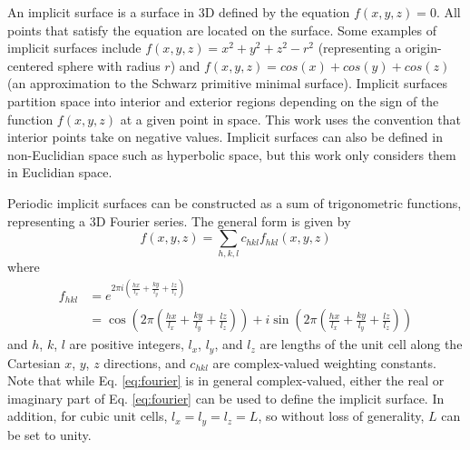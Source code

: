 \documentclass{article}
\begin{document}
An implicit surface is a surface in 3D defined by the equation $f(x, y, z) = 0$. All points that satisfy the equation are located on the surface. Some examples of implicit surfaces include $f(x, y, z) = x^2 + y^2 + z^2 - r^2$ (representing a origin-centered sphere with radius $r$) and $f(x, y, z) = cos(x) + cos(y) + cos(z)$ (an approximation to the Schwarz primitive minimal surface). Implicit surfaces partition space into interior and exterior regions depending on the sign of the function $f(x, y, z)$ at a given point in space. This work uses the convention that interior points take on negative values. Implicit surfaces can also be defined in non-Euclidian space such as hyperbolic space, but this work only considers them in Euclidian space.

Periodic implicit surfaces can be constructed as a sum of trigonometric functions, representing a 3D Fourier series. The general form is given by
\begin{equation}
    \label{eq:fourier}
        f(x, y, z) = \sum\limits_{h,k,l} c_{hkl} f_{hkl}(x, y, z)
\end{equation}
where
\begin{equation}
    \begin{split}
        f_{hkl} & = e^{2\pi i\left(\frac{hx}{l_x}+\frac{ky}{l_y}+\frac{lz}{l_z}\right)} \\
        & = \cos{\left(2\pi \left(\frac{hx}{l_x}+\frac{ky}{l_y}+\frac{lz}{l_z}\right)\right)} + i \sin{\left(2\pi \left(\frac{hx}{l_x}+\frac{ky}{l_y}+\frac{lz}{l_z}\right)\right)}
    \end{split}
\end{equation}
and $h$, $k$, $l$ are positive integers, $l_x$, $l_y$, and $l_z$ are lengths of the unit cell along the Cartesian $x$, $y$, $z$ directions, and $c_{hkl}$ are complex-valued weighting constants. Note that while Eq. \ref{eq:fourier} is in general complex-valued, either the real or imaginary part of Eq. \ref{eq:fourier} can be used to define the implicit surface. In addition, for cubic unit cells, $l_x = l_y = l_z = L$, so without loss of generality, $L$ can be set to unity.
\end{document}
